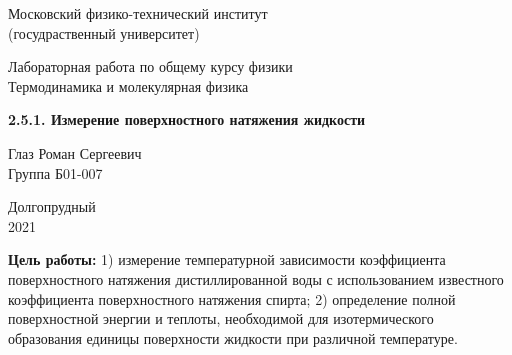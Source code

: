 \documentclass[a4paper, 12pt]{article} %
\begin{document}


\begin{titlepage}

    \newpage
    \begin{center}
        \normalsize Московский физико-технический институт \\(госудраственный университет)
    \end{center}

    \vspace{6em}

    \begin{center}
        \Large Лабораторная работа по общему курсу физики\\Термодинамика и молекулярная физика
    \end{center}

    \vspace{1em}

    \begin{center}
        \Large \textbf{2.5.1. Измерение поверхностного натяжения жидкости }
    \end{center}

    \vspace{2em}

    \begin{center}
        \large Глаз Роман Сергеевич\\
        Группа Б01-007
    \end{center}

    \vspace{\fill}

    \begin{center}
        Долгопрудный \\2021
    \end{center}
    
\end{titlepage}



    \thispagestyle{empty}
    \newpage
    \tableofcontents
    \newpage
    \setcounter{page}{1}



\textbf{Цель работы:} 1) измерение температурной зависимости коэффициента поверхностного натяжения дистиллированной воды с использованием известного коэффициента поверхностного натяжения спирта; 2) определение полной поверхностной энергии и теплоты, необходимой для изотермического образования единицы поверхности жидкости при различной температуре.\\
\end{document}
